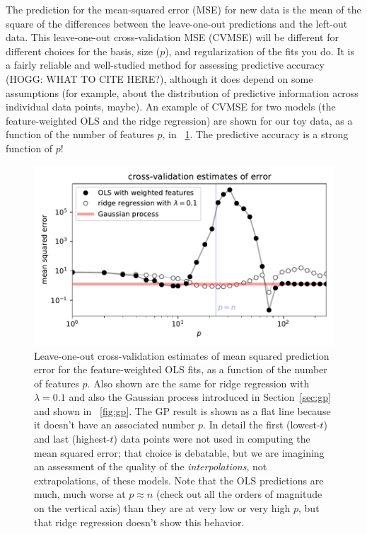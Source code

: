 \documentclass[12pt,letterpaper]{article}
\newlength{\figurewidth}
\newcommand{\sectionname}{Section}
\begin{document}
The prediction for the mean-squared error (MSE) for new data is the mean of the square of the differences between the leave-one-out predictions and the left-out data.
This leave-one-out cross-validation MSE (CVMSE) will be different for different choices for the basis, size ($p$), and regularization of the fits you do.
It is a fairly reliable and well-studied method for assessing predictive accuracy (HOGG: WHAT TO CITE HERE?), although it does depend on some assumptions (for example, about the distribution of predictive information across individual data points, maybe).
An example of CVMSE for two models (the feature-weighted OLS and the ridge regression) are shown for our toy data, as a function of the number of features $p$, in \figurename~\ref{fig:cv}.
The predictive accuracy is a strong function of $p$!
\begin{figure}[t]
    \begin{mdframed}
    \includegraphics[width=\figurewidth]{paper/cross-validation.pdf}
    \caption{Leave-one-out cross-validation estimates of mean squared prediction error for the feature-weighted OLS fits, as a function of the number of features $p$. Also shown are the same for ridge regression with $\lambda=0.1$ and also the Gaussian process introduced in \sectionname~\ref{sec:gp} and shown in \figurename~\ref{fig:gp}. The GP result is shown as a flat line because it doesn't have an associated number $p$. In detail the first (lowest-$t$) and last (highest-$t$) data points were not used in computing the mean squared error; that choice is debatable, but we are imagining an assessment of the quality of the \emph{interpolations}, not extrapolations, of these models. Note that the OLS predictions are much, much worse at $p\approx n$ (check out all the orders of magnitude on the vertical axis) than they are at very low or very high $p$, but that ridge regression doesn't show this behavior.}
    \label{fig:cv}
    \end{mdframed}
\end{figure}
\end{document}
